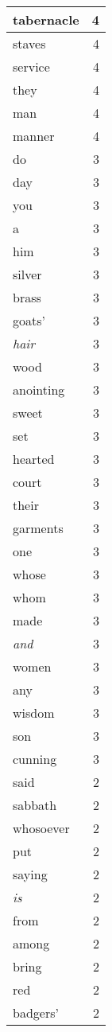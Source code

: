 \begin{center}
\begin{longtable}{l|r}
tabernacle & 4 \\ \hline
staves & 4 \\ \hline
service & 4 \\ \hline
they & 4 \\ \hline
man & 4 \\ \hline
manner & 4 \\ \hline
do & 3 \\ \hline
day & 3 \\ \hline
you & 3 \\ \hline
a & 3 \\ \hline
him & 3 \\ \hline
silver & 3 \\ \hline
brass & 3 \\ \hline
goats' & 3 \\ \hline
\emph{hair} & 3 \\ \hline
wood & 3 \\ \hline
anointing & 3 \\ \hline
sweet & 3 \\ \hline
set & 3 \\ \hline
hearted & 3 \\ \hline
court & 3 \\ \hline
their & 3 \\ \hline
garments & 3 \\ \hline
one & 3 \\ \hline
whose & 3 \\ \hline
whom & 3 \\ \hline
made & 3 \\ \hline
\emph{and} & 3 \\ \hline
women & 3 \\ \hline
any & 3 \\ \hline
wisdom & 3 \\ \hline
son & 3 \\ \hline
cunning & 3 \\ \hline
said & 2 \\ \hline
sabbath & 2 \\ \hline
whosoever & 2 \\ \hline
put & 2 \\ \hline
saying & 2 \\ \hline
\emph{is} & 2 \\ \hline
from & 2 \\ \hline
among & 2 \\ \hline
bring & 2 \\ \hline
red & 2 \\ \hline
badgers' & 2 \\ \hline

\end{longtable}
\end{center}

